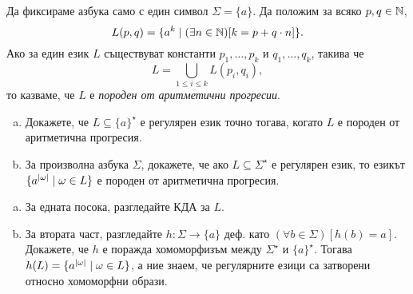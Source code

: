 \begin{problem}
  Да фиксираме азбука само с един символ $\Sigma = \{a\}$.
  Да положим за всяко $p,q\in\mathbb{N}$, 
  \[L(p,q) = \{a^k \mid (\exists n\in\mathbb{N})[k = p+q\cdot n]\}.\]
  Ако за един език $L$ съществуват константи $p_1,\dots,p_k$ и $q_1,\dots,q_k$, такива че 
  \[L = \bigcup_{1\leq i \leq k} L(p_i,q_i),\]
  то казваме, че $L$ е {\em породен от аритметични прогресии}.
  \begin{enumerate}[a)]
  \item 
    Докажете, че $L \subseteq \{a\}^\star$ е регулярен език точно тогава, когато $L$ е породен от аритметична прогресия.
  \item
    За произволна азбука $\Sigma$, докажете, че ако $L \subseteq \Sigma^\star$ е регулярен език,
    то езикът $\{a^{\lvert{\omega}\rvert} \mid \omega \in L\}$  е породен от аритметична прогресия.    
  \end{enumerate}
\end{problem}
\begin{hint}
  \begin{enumerate}[a)]
  \item 
    За едната посока, разгледайте КДА за $L$.
  \item
    За втората част, разгледайте $h:\Sigma\to\{a\}$ деф. като $(\forall b\in\Sigma)[h(b) = a]$.
    Докажете, че $h$ е поражда хомоморфизъм между $\Sigma^\star$ и $\{a\}^\star$.
    Тогава $h(L) = \{a^{\lvert{\omega}\rvert} \mid \omega \in L\}$, а
    ние знаем, че регулярните езици са затворени относно хомоморфни образи.  
  \end{enumerate}
\end{hint}




